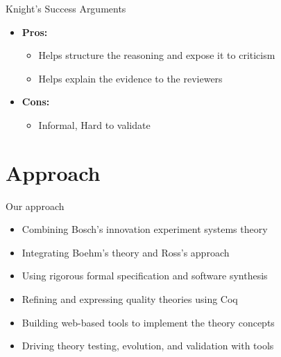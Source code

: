 \documentclass[xcolor=x11names,compress]{beamer}
\renewcommand{\(}{\begin{columns}}
\renewcommand{\)}{\end{columns}}
\newcommand{\<}[1]{\begin{column}{#1}}
\renewcommand{\>}{\end{column}}
\begin{document}
\begin{frame}{Knight's Success Arguments}
\begin{itemize}
\item \textbf{Pros:} \\
	\begin{itemize}
	\item Helps structure the reasoning and expose it to criticism
	\item Helps explain the evidence to the reviewers
    \end{itemize}
\item \textbf{Cons:} \\
    \begin{itemize}
	\item Informal, Hard to validate
    \end{itemize}
\end{itemize}
\end{frame}


\section{Approach}
\begin{frame}{Our approach}
\begin{itemize}
		\item Combining Bosch's innovation experiment systems  theory
        \item Integrating Boehm's theory and Ross's approach
		\item Using rigorous formal specification and software synthesis
		\item Refining and expressing quality theories using Coq
		\item Building web-based tools to implement the theory concepts
		\item Driving theory testing, evolution, and validation with tools
\end{itemize}
\end{frame}
\end{document}
